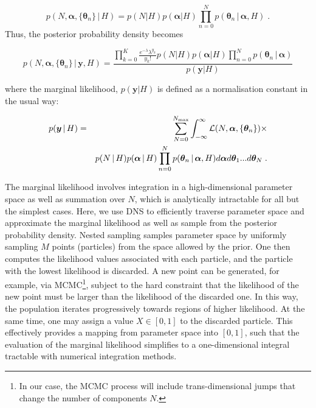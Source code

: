\documentclass[12pt]{emulateapj}
\newcommand{\given}{\,|\,}
\newcommand{\counts}{y}
\newcommand{\likelihood}{{\mathcal L}}
\begin{document}
\begin{equation}
p(N, \bm{\alpha}, \{\bm{\theta}_n \} \given H) = p(N|H)p(\bm{\alpha}|H) \prod\limits_{n=0}^{N}  p(\bm{\theta}_n\given \bm{\alpha}, H) \; .
\end{equation}
Thus, the posterior probability density becomes

\begin{equation}
p(N, \bm{\alpha}, \{\bm{\theta}_n \}  \given \bm{\counts}, H) =  \frac{\prod\limits_{k=0}^{K}{ \frac{e^{-\lambda} \lambda^{y_k} }{y_k! }} p(N|H)p(\bm{\alpha}|H) \prod\limits_{n=0}^{N}  p(\bm{\theta}_n\given \bm{\alpha})}{p(\bm{\counts} | H)}
\end{equation}

where the marginal likelihood, $p(\bm{\counts} | H)$ is defined as a normalisation constant in the usual way: 

\begin{eqnarray}
p(\bm{\counts} \given H) & = & \sum_{N=0}^{N_{\rm max}} \int_{-\infty}^{\infty}{\likelihood(N, \bm{\alpha}, \{\bm{\theta}_n \})} \times \\ \nonumber
&& p(N\given H)p(\bm{\alpha} \given H) \prod\limits_{n=0}^{N}  p(\bm{\theta}_n\given \bm{\alpha}, H) d\bm{\alpha} d\bm{\theta}_1 ... d\bm{\theta}_N \; .
\label{eqn:marginal}
\end{eqnarray}


The marginal likelihood involves integration in a high-dimensional parameter space as well as summation over $N$, which is analytically intractable for all but the
simplest cases. Here, we use DNS to efficiently traverse parameter space and approximate the marginal 
likelihood as well as sample from the posterior probability density. 
Nested sampling \citep{skilling2006} samples parameter space by uniformly sampling $M$ points (particles) from the space allowed by the prior. 
One then computes the likelihood values associated with each particle, and the particle with the lowest likelihood is discarded. A new point
can be generated, for example, via MCMC\footnote{In our case, the MCMC process will include trans-dimensional jumps that change the number of components $N$.}, subject to the hard constraint that the
likelihood of the new point must be larger than the likelihood of the discarded one. In this way, the population iterates progressively towards
regions of higher likelihood. At the same time, one may assign a value $X  \in [0, 1]$ to the discarded particle. This effectively provides a 
mapping from parameter space into $[0,1]$, such that the evaluation of the marginal likelihood simplifies to a one-dimensional 
integral tractable with numerical integration methods.
\end{document}

